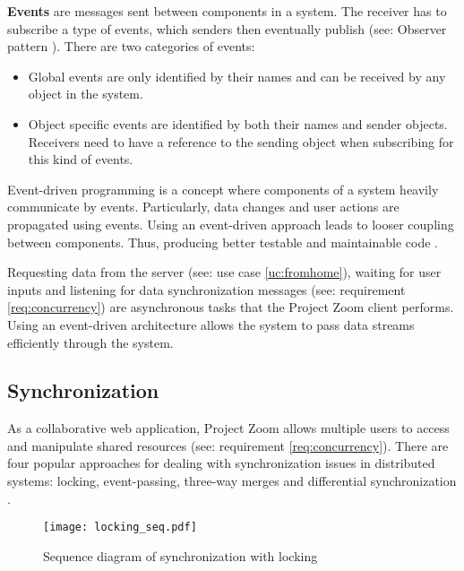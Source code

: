\textbf{Events} are messages sent between components in a system. The receiver has to subscribe a type of events, which senders then eventually publish (see: Observer pattern \cite{Gamma_1994}). There are two categories of events:
\begin{itemize}
\item Global events are only identified by their names and can be received by any object in the system.
\item Object specific events are identified by both their names and sender objects. Receivers need to have a reference to the sending object when subscribing for this kind of events.
\end{itemize}

Event-driven programming is a concept where components of a system heavily communicate by events. Particularly, data changes and user actions are propagated using events. Using an event-driven approach leads to looser coupling between components. Thus, producing better testable and maintainable code \cite{Faison_2011}.

Requesting data from the server (see: use case \ref{uc:fromhome}), waiting for user inputs and listening for data synchronization messages (see: requirement \ref{req:concurrency}) are asynchronous tasks that the Project Zoom client performs. Using an event-driven architecture allows the system to pass data streams efficiently through the system.


\subsection{Synchronization}
As a collaborative web application, Project Zoom allows multiple users to access and manipulate shared resources (see: requirement \ref{req:concurrency}). There are four popular approaches for dealing with synchronization issues in distributed systems: locking, event-passing, three-way merges and differential synchronization \cite{Fraser_2009}.

\begin{figure}[!h]
\begin{center}
\texttt{[image: locking\_seq.pdf]}
\caption{Sequence diagram of synchronization with locking}
\label{fig:locking}
\end{center}
\end{figure}

